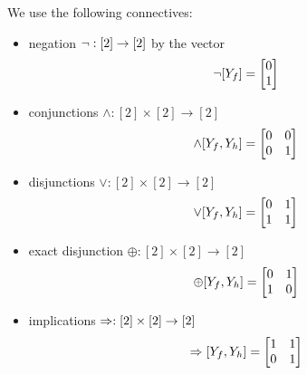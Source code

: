 \begin{example}
    \label{exa:connectives}
    We use the following connectives:
    \begin{itemize}
        \item negation $\lnot: [2]\rightarrow [2]$ by the vector
        \begin{align*}
            \lnot[Y_{f}] = \begin{bmatrix}
                                          0 \\
                                          1
            \end{bmatrix}
        \end{align*}
        \item conjunctions $\land:  [2]\times[2] \rightarrow[2]$
        \begin{align*}
            \land[Y_{f},Y_{h}]
            = \begin{bmatrix}
                  0 & 0 \\
                  0 & 1
            \end{bmatrix}
        \end{align*}
        \item disjunctions $\lor : [2]\times[2] \rightarrow[2]$
        \begin{align*}
            \lor[Y_{f},Y_{h}]
            = \begin{bmatrix}
                  0 & 1 \\
                  1 & 1
            \end{bmatrix}
        \end{align*}
        \item exact disjunction $\oplus:  [2]\times[2] \rightarrow[2]$
        \begin{align*}
            \oplus[Y_{f},Y_{h}]
            = \begin{bmatrix}
                  0 & 1 \\
                  1 & 0
            \end{bmatrix}
        \end{align*}
        \item implications $\Rightarrow:  [2]\times[2] \rightarrow[2]$
        \begin{align*}
            \Rightarrow[Y_{f},Y_{h}]
            = \begin{bmatrix}
                  1 & 1 \\
                  0 & 1

\end{bmatrix}
\end{align*}
\end{itemize}
\end{example}
